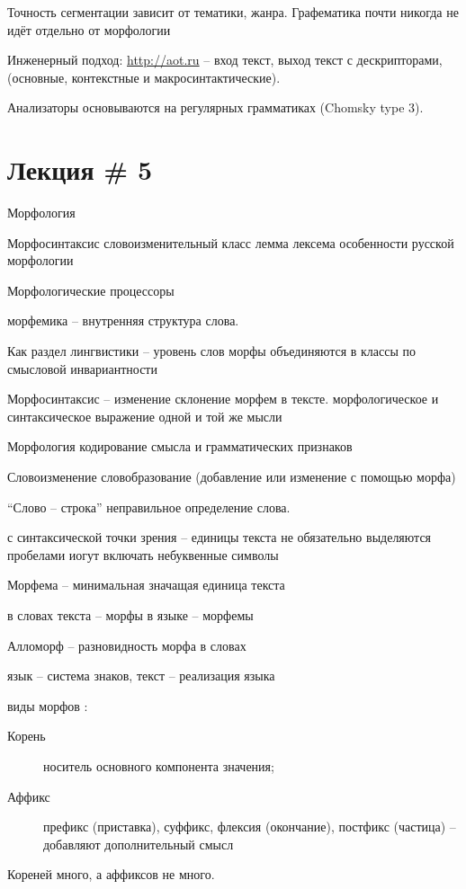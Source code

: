 \documentclass[a4paper]{article}
\newcommand{\eng}[1]{\foreignlanguage{english}{#1}}
\begin{document}
Точность сегментации зависит от тематики, жанра.
Графематика почти никогда не идёт отдельно от морфологии

Инженерный подход: \url{http://aot.ru} -- вход текст, выход текст с дескрипторами, (основные, контекстные и макросинтактические).


Анализаторы основываются на регулярных грамматиках (\eng{Chomsky type 3}).


\section{Лекция \# 5} %
\label{sec:lecture_5}

Морфология

Морфосинтаксис
	словоизменительный класс
	лемма
	лексема
	особенности русской морфологии

Морфологические процессоры

морфемика -- внутренняя структура слова.

Как раздел лингвистики -- уровень слов
морфы объединяются в классы по смысловой инвариантности

Морфосинтаксис -- изменение склонение морфем в тексте.
морфологическое и синтаксическое выражение одной и той же мысли


Морфология кодирование смысла и грамматических признаков

Словоизменение
словобразование (добавление или изменение с помощью морфа)

``Слово -- строка'' неправильное определение слова.

с синтаксической точки зрения -- единицы текста
не обязательно выделяются пробелами
иогут включать небуквенные символы


Морфема -- минимальная значащая единица текста

в словах текста -- морфы
в языке -- морфемы

Алломорф -- разновидность морфа в словах

язык -- система знаков, текст -- реализация языка

виды морфов :
\begin{description}
	\item[Корень] носитель основного компонента значения;
	\item[Аффикс] префикс (приставка), суффикс, флексия (окончание), постфикс (частица) -- добавляют дополнительный смысл
\end{description}
Кореней много, а аффиксов не много.
\end{document}
